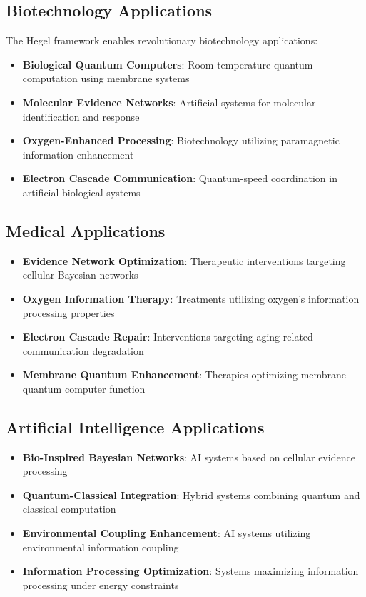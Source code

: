 \documentclass[12pt,a4paper]{article}
\begin{document}
\subsection{Biotechnology Applications}

The Hegel framework enables revolutionary biotechnology applications:

\begin{itemize}
\item \textbf{Biological Quantum Computers}: Room-temperature quantum computation using membrane systems
\item \textbf{Molecular Evidence Networks}: Artificial systems for molecular identification and response
\item \textbf{Oxygen-Enhanced Processing}: Biotechnology utilizing paramagnetic information enhancement
\item \textbf{Electron Cascade Communication}: Quantum-speed coordination in artificial biological systems
\end{itemize}

\subsection{Medical Applications}

\begin{itemize}
\item \textbf{Evidence Network Optimization}: Therapeutic interventions targeting cellular Bayesian networks
\item \textbf{Oxygen Information Therapy}: Treatments utilizing oxygen's information processing properties
\item \textbf{Electron Cascade Repair}: Interventions targeting aging-related communication degradation
\item \textbf{Membrane Quantum Enhancement}: Therapies optimizing membrane quantum computer function
\end{itemize}

\subsection{Artificial Intelligence Applications}

\begin{itemize}
\item \textbf{Bio-Inspired Bayesian Networks}: AI systems based on cellular evidence processing
\item \textbf{Quantum-Classical Integration}: Hybrid systems combining quantum and classical computation
\item \textbf{Environmental Coupling Enhancement}: AI systems utilizing environmental information coupling
\item \textbf{Information Processing Optimization}: Systems maximizing information processing under energy constraints
\end{itemize}
\end{document}
